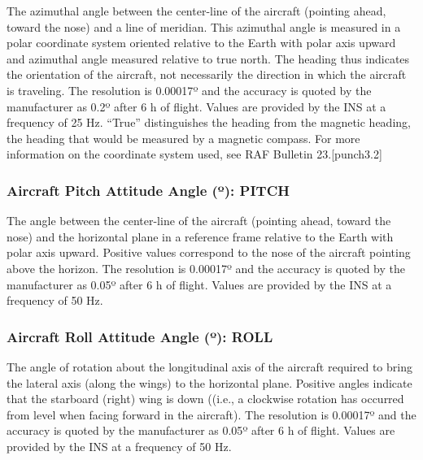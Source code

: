 \documentclass[
  english,
]{book}
\begin{document}
The azimuthal angle between the center-line of the aircraft (pointing ahead, toward the nose) and a line of meridian. This azimuthal angle is measured in a polar coordinate system oriented relative to the Earth with polar axis upward and azimuthal angle measured relative to true north. The heading thus indicates the orientation of the aircraft, not necessarily the direction in which the aircraft is traveling. The resolution is 0.00017{º} and the accuracy is quoted by the manufacturer as 0.2{º} after 6 h of flight. Values are provided by the INS at a frequency of 25 Hz. ``True'' distinguishes the heading from the magnetic heading, the heading that would be measured by a magnetic compass. For more information on the coordinate system used, see RAF Bulletin 23.\protect\hypertarget{punch3.2}{}{{[}punch3.2{]}}

\hypertarget{pitch}{%
\subsubsection*{\texorpdfstring{Aircraft Pitch Attitude Angle ({º}): PITCH}{Aircraft Pitch Attitude Angle (º): PITCH}}\label{pitch}}

The angle between the center-line of the aircraft (pointing ahead, toward the nose) and the horizontal plane in a reference frame relative to the Earth with polar axis upward. Positive values correspond to the nose of the aircraft pointing above the horizon. The resolution is 0.00017{º} and the accuracy is quoted by the manufacturer as 0.05{º} after 6 h of flight. Values are provided by the INS at a frequency of 50 Hz.

\hypertarget{roll}{%
\subsubsection*{\texorpdfstring{Aircraft Roll Attitude Angle ({º}): ROLL}{Aircraft Roll Attitude Angle (º): ROLL}}\label{roll}}

The angle of rotation about the longitudinal axis of the aircraft required to bring the lateral axis (along the wings) to the horizontal plane. Positive angles indicate that the starboard (right) wing is down ((i.e., a clockwise rotation has occurred from level when facing forward in the aircraft). The resolution is 0.00017{º} and the accuracy is quoted by the manufacturer as 0.05{º} after 6 h of flight. Values are provided by the INS at a frequency of 50 Hz.
\end{document}

